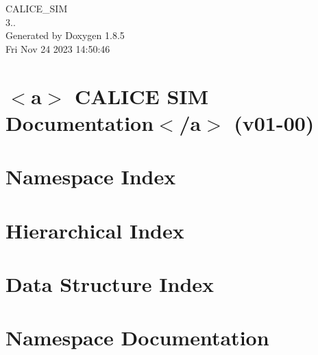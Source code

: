 \documentclass[twoside]{book}
\newcommand{\clearemptydoublepage}{%
  \newpage{\pagestyle{empty}\cleardoublepage}%
}
\begin{document}
\begin{titlepage}
\vspace*{7cm}
\begin{center}%
{\Large C\-A\-L\-I\-C\-E\-\_\-\-S\-I\-M \\[1ex]\large 3.. }\\
\vspace*{1cm}
{\large Generated by Doxygen 1.8.5}\\
\vspace*{0.5cm}
{\small Fri Nov 24 2023 14:50:46}\\
\end{center}
\end{titlepage}
\clearemptydoublepage
\tableofcontents
\clearemptydoublepage
{}

\chapter{$<$a$>$ C\-A\-L\-I\-C\-E S\-I\-M Documentation$<$/a$>$ (v01-\/00)}
\label{index}
\chapter{Namespace Index}

\chapter{Hierarchical Index}

\chapter{Data Structure Index}

\chapter{Namespace Documentation}





\end{document}

